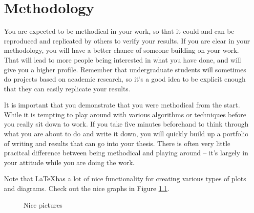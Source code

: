 \chapter{Methodology}

You are expected to be methodical in your work, so that it could and can be
reproduced and replicated by others to verify your results.
If you are clear in your methodology, you will have a better chance of someone
building on your work.
That will lead to more people being interested in what you have done, and will
give you a higher profile.
Remember that undergraduate students will sometimes do projects based on
academic research, so it's a good idea to be explicit enough that they can
easily replicate your results.

It is important that you demonstrate that you were methodical from the start.
While it is tempting to play around with various algorithms or techniques
before you really sit down to work.
If you take five minutes beforehand to think through what you are about to do
and write it down, you will quickly build up a portfolio of writing and results
that can go into your thesis.
There is often very little pracitcal difference between being methodical and
playing around -- it's largely in your attitude while you are doing the work.

Note that \LaTeX has a lot of nice functionality for creating various types of
plots and diagrams.
Check out the nice graphs in Figure \ref{tikz:graphs}.

\lipsum[26]

\begin{figure}[ht]
  \centering
  \hspace{1.5cm}
  \caption{Nice pictures}
  \label{tikz:graphs}
\end{figure}

\lipsum[26-28]